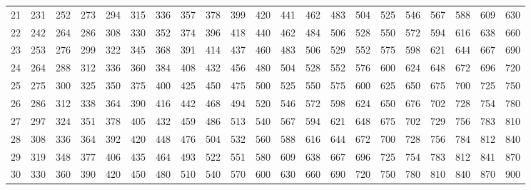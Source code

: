 \documentclass[landscape,twocolumn,a4paper]{article}
\begin{document}
\begin{tabular}{r||r|r|r|r|r|r|r|r|r|r|r|r|r|r|r|r|r|r|r|r}
\\ 
21 & 231 & 252 & 273 & 294 & 315 & 336 & 357 & 378 & 399 & 420 & 441 & 462 & 483 & 504 & 525 & 546 & 567 & 588 & 609 & 630
\\ 
22 & 242 & 264 & 286 & 308 & 330 & 352 & 374 & 396 & 418 & 440 & 462 & 484 & 506 & 528 & 550 & 572 & 594 & 616 & 638 & 660
\\ 
23 & 253 & 276 & 299 & 322 & 345 & 368 & 391 & 414 & 437 & 460 & 483 & 506 & 529 & 552 & 575 & 598 & 621 & 644 & 667 & 690
\\ 
24 & 264 & 288 & 312 & 336 & 360 & 384 & 408 & 432 & 456 & 480 & 504 & 528 & 552 & 576 & 600 & 624 & 648 & 672 & 696 & 720
\\ 
25&275&300&325&350&375&400&425&450&475&500&525&550&575&600&625&650&675&700&725&750\\
26&286&312&338&364&390&416&442&468&494&520&546&572&598&624&650&676&702&728&754&780\\
27 & 297 & 324 & 351 & 378 & 405 & 432 & 459 & 486 & 513 & 540 & 567 & 594 & 621 & 648 & 675 & 702 & 729 & 756 & 783 & 810
\\ 
28 & 308 & 336 & 364 & 392 & 420 & 448 & 476 & 504 & 532 & 560 & 588 & 616 & 644 & 672 & 700 & 728 & 756 & 784 & 812 & 840
\\ 
29 & 319 & 348 & 377 & 406 & 435 & 464 & 493 & 522 & 551 & 580 & 609 & 638 & 667 & 696 & 725 & 754 & 783 & 812 & 841 & 870
\\ 
30 & 330 & 360 & 390 & 420 & 450 & 480 & 510 & 540 & 570 & 600 & 630 & 660 & 690 & 720 & 750 & 780 & 810 & 840 & 870 & 900
\\ 
\end{tabular}
\end{document}

